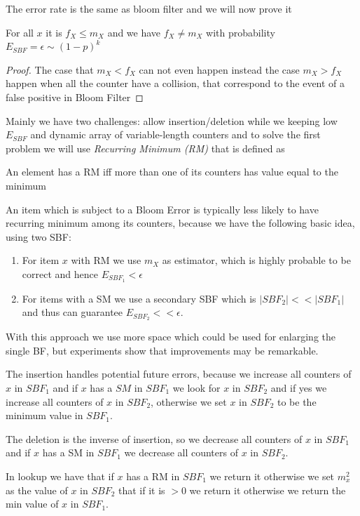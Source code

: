     The error rate is the same as bloom filter and we will now prove it 
    \begin{thm}
	For all $x$ it is $f_X \leq m_X$ and we have $f_X \neq m_X$ with probability $E_{SBF} = \epsilon \sim (1-p)^k$
    \end{thm}
    \begin{proof}
	The case that $m_X < f_X$ can not even happen instead the case $m_X > f_X$ happen when all the counter have a collision, that correspond to the event of a false positive in Bloom Filter
    \end{proof}
    Mainly we have two challenges: allow insertion/deletion while we keeping low $E_{SBF}$ and dynamic array of variable-length counters and to solve the first problem we will use \emph{Recurring Minimum (RM)} that is defined as 
    \begin{defi}
	An element has a RM iff more than one of its counters has value equal to the minimum
    \end{defi}
    An item which is subject to a Bloom Error is typically less likely to have recurring minimum among its counters, because we have the following basic idea, using two SBF:
    \begin{enumerate}
	\item For item $x$ with RM we use $m_X$ as estimator, which is highly probable to be correct and hence $E_{SBF_1} < \epsilon$
	\item For items with a SM we use a secondary SBF which is $|SBF_2| << |SBF_1|$ and thus can guarantee $E_{SBF_2} << \epsilon$.
    \end{enumerate}
    With this approach we use more space which could be used for enlarging the single BF, but experiments show that improvements may be remarkable.

    The insertion handles potential future errors, because we increase all counters of $x$ in $SBF_1$ and if $x$ has a $SM$ in $SBF_1$ we look for $x$ in $SBF_2$ and 
    if yes we increase all counters of $x$ in $SBF_2$, otherwise we set $x$ in $SBF_2$ to be the minimum value in $SBF_1$.

    The deletion is the inverse of insertion, so we decrease all counters of $x$ in $SBF_1$ and if $x$ has a SM in $SBF_1$ we decrease all counters of $x$ in $SBF_2$.

    In lookup we have that if $x$ has a RM in $SBF_1$ we return it otherwise we set $m_x^2$ as the value of $x$ in $SBF_2$ that if it is $> 0$ we return it otherwise we return the min value of $x$ in $SBF_1$.


